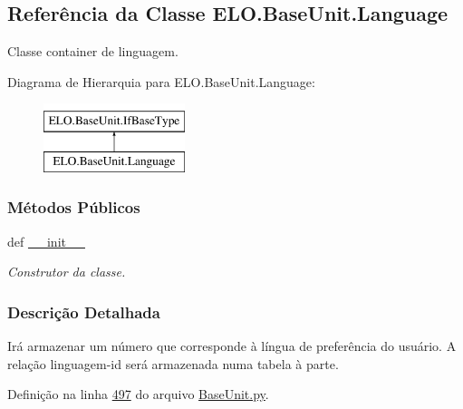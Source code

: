 \hypertarget{classELO_1_1BaseUnit_1_1Language}{\subsection{Referência da Classe E\-L\-O.\-Base\-Unit.\-Language}
\label{classELO_1_1BaseUnit_1_1Language}
}


Classe container de linguagem.  


Diagrama de Hierarquia para E\-L\-O.\-Base\-Unit.\-Language\-:\begin{figure}[H]
\begin{center}
\leavevmode
\includegraphics[height=2.000000cm]{d2/d3e/classELO_1_1BaseUnit_1_1Language}
\end{center}
\end{figure}
\subsubsection*{Métodos Públicos}
\begin{DoxyCompactItemize}
\item 
def \hyperlink{classELO_1_1BaseUnit_1_1Language_a0b717ad014a17f87cbe20caf5be56fb8}{\-\_\-\-\_\-init\-\_\-\-\_\-}
\begin{DoxyCompactList}\small\item\em Construtor da classe. \end{DoxyCompactList}\end{DoxyCompactItemize}


\subsubsection{Descrição Detalhada}
Irá armazenar um número que corresponde à língua de preferência do usuário. A relação linguagem-\/id será armazenada numa tabela à parte. 

Definição na linha \hyperlink{BaseUnit_8py_source_l00497}{497} do arquivo \hyperlink{BaseUnit_8py_source}{Base\-Unit.\-py}.



